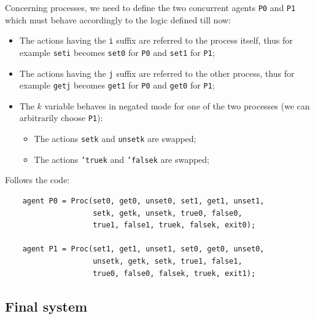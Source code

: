 \documentclass[10pt,a4paper]{article}
\newcommand{\CCSCode}[1]{{\tt #1}}
\newcommand{\Agent}[1]{{\tt {#1}}}
\begin{document}
            Concerning processes, we need to define the two concurrent
            agents \Agent{P0} and \Agent{P1} which must behave accordingly
            to the logic defined till now:
            \begin{itemize}

            \item   The actions having the \CCSCode{i} suffix are referred
                    to the process itself, thus for example \CCSCode{seti}
                    becomes \CCSCode{set0} for \Agent{P0} and
                    \CCSCode{set1} for \Agent{P1};

            \item   The actions having the \CCSCode{j} suffix are referred
                    to the other process, thus for example \CCSCode{getj}
                    becomes \CCSCode{get1} for \Agent{P0} and
                    \CCSCode{get0} for \Agent{P1};

            \item   The $k$ variable behaves in negated mode for one of
                    the two processes (we can arbitrarily choose
                    \Agent{P1}):

                \begin{itemize}

                \item   The actions \CCSCode{setk} and \CCSCode{unsetk}
                        are swapped;
                \item   The actions \CCSCode{'truek} and \CCSCode{'falsek}
                        are swapped;

                \end{itemize}

            \end{itemize}

\newpage
            Follows the code:
            \begin{verbatim}
    agent P0 = Proc(set0, get0, unset0, set1, get1, unset1,
                    setk, getk, unsetk, true0, false0,
                    true1, false1, truek, falsek, exit0);

    agent P1 = Proc(set1, get1, unset1, set0, get0, unset0,
                    unsetk, getk, setk, true1, false1,
                    true0, false0, falsek, truek, exit1);
        \end{verbatim}

    \subsection{Final system}
\end{document}
